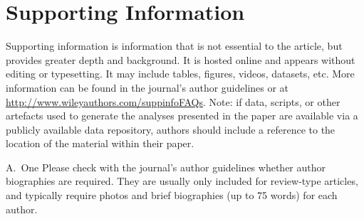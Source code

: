 \documentclass[num-refs]{wiley-article}
\begin{document}
\section*{Supporting Information}

Supporting information is information that is not essential to the article, but provides greater depth and background. It is hosted online and appears without editing or typesetting. It may include tables, figures, videos, datasets, etc. More information can be found in the journal's author guidelines or at \url{http://www.wileyauthors.com/suppinfoFAQs}. Note: if data, scripts, or other artefacts used to generate the analyses presented in the paper are available via a publicly available data repository, authors should include a reference to the location of the material within their paper.

\printendnotes



\begin{biography}{A.~One}
Please check with the journal's author guidelines whether author biographies are required. They are usually only included for review-type articles, and typically require photos and brief biographies (up to 75 words) for each author.
\bigskip
\bigskip
\end{biography}

\end{document}
